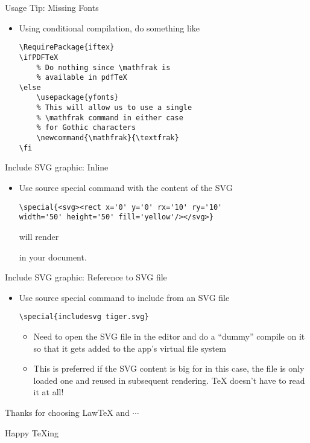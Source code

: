 \documentclass{beamer}
\begin{document}
\begin{frame}[fragile]{Usage Tip: Missing Fonts}
\begin{itemize}
\item Using conditional compilation, do something like
\begin{lstlisting}
\RequirePackage{iftex}
\ifPDFTeX
    % Do nothing since \mathfrak is
    % available in pdfTeX
\else
    \usepackage{yfonts}
    % This will allow us to use a single
    % \mathfrak command in either case
    % for Gothic characters
    \newcommand{\mathfrak}{\textfrak}
\fi
\end{lstlisting}
\end{itemize}
\end{frame}

\begin{frame}[fragile]{Include SVG graphic: Inline}
\lstset{language=TeX}
\begin{itemize}
\item Use source special command with the content of the SVG

\begin{lstlisting}
\special{<svg><rect x='0' y='0' rx='10' ry='10'
width='50' height='50' fill='yellow'/></svg>}
\end{lstlisting}

will render  \hspace{0.8cm}\vspace{1cm}

in your document.
\end{itemize}
\end{frame}

\begin{frame}[fragile]{Include SVG graphic: Reference to SVG file}
\lstset{language=TeX}
\begin{itemize}
\item Use source special command to include from an SVG file

\begin{lstlisting}
\special{includesvg tiger.svg}
\end{lstlisting}


\begin{itemize}
\item Need to open the SVG file in the editor and do a ``dummy'' compile on it so that it gets added to the app's virtual file system
\item This is preferred if the SVG content is big for in this case, the file is only loaded one and reused in subsequent rendering. TeX doesn't have to read it at all!
\end{itemize}
\end{itemize}
\end{frame}

\begin{frame}{Thanks for choosing LawTeX and $\cdots$}
\begin{center}
\Huge Happy \TeX ing
\end{center}
\end{frame}
\end{document}
